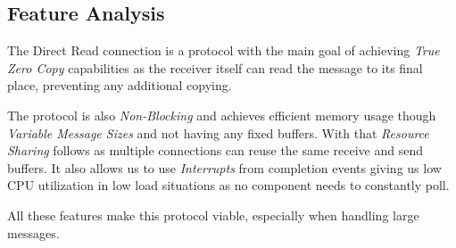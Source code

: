 \subsection{Feature Analysis}

The Direct Read connection is a protocol with the main goal of achieving  \emph{True Zero Copy} capabilities as 
the receiver itself can read the message to its final place, preventing any additional 
copying. 

The protocol is also \emph{Non-Blocking} and achieves efficient memory usage though \emph{Variable Message Sizes} and not 
having any fixed buffers. With that \emph{Resource Sharing} follows as multiple connections can reuse the same receive and 
send buffers. It also allows us to use \emph{Interrupts} from completion events
giving us low CPU utilization in low load situations as no component needs to constantly poll.

All these features make this protocol viable, especially when handling large messages.
